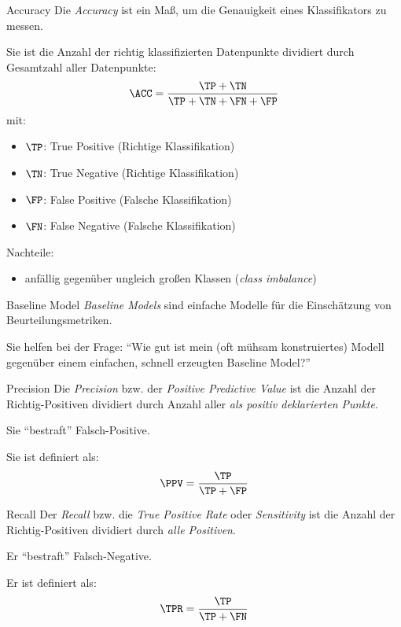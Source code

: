 \begin{defi}{Accuracy}
    Die \emph{Accuracy} ist ein Maß, um die Genauigkeit eines Klassifikators zu messen.

    Sie ist die Anzahl der richtig klassifizierten Datenpunkte dividiert durch Gesamtzahl aller Datenpunkte:
    \[
        \ACC = \frac{\TP + \TN}{\TP + \TN + \FN + \FP}
    \]
    mit:
    \begin{itemize}
        \item $\TP$: True Positive (Richtige Klassifikation)
        \item $\TN$: True Negative (Richtige Klassifikation)
        \item $\FP$: False Positive (Falsche Klassifikation)
        \item $\FN$: False Negative (Falsche Klassifikation)
    \end{itemize}

    Nachteile:
    \begin{itemize}
        \item anfällig gegenüber ungleich großen Klassen (\emph{class imbalance})
    \end{itemize}
\end{defi}

\begin{bonus}{Baseline Model}
    \emph{Baseline Models} sind einfache Modelle für die Einschätzung von Beurteilungsmetriken.

    Sie helfen bei der Frage:
    \enquote{Wie gut ist mein (oft mühsam konstruiertes) Modell gegenüber einem einfachen, schnell erzeugten Baseline Model?}
\end{bonus}

\begin{defi}{Precision}
    Die \emph{Precision} bzw. der \emph{Positive Predictive Value} ist die Anzahl der Richtig-Positiven dividiert durch Anzahl aller \emph{als positiv deklarierten Punkte}.

    Sie \enquote{bestraft} Falsch-Positive.

    Sie ist definiert als:
    \[
        \PPV = \frac{\TP}{\TP + \FP}
    \]
\end{defi}

\begin{defi}{Recall}
    Der \emph{Recall} bzw. die \emph{True Positive Rate} oder \emph{Sensitivity} ist die Anzahl der Richtig-Positiven dividiert durch \emph{alle Positiven}.

    Er \enquote{bestraft} Falsch-Negative.

    Er ist definiert als:
    \[
        \TPR = \frac{\TP}{\TP + \FN}
    \]
\end{defi}

